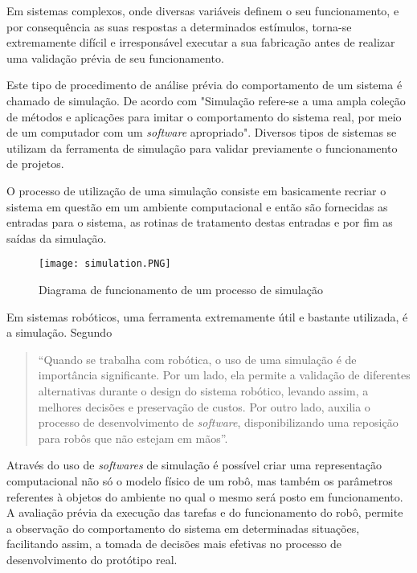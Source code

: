 Em sistemas complexos, onde diversas variáveis definem o seu funcionamento, e por consequência as suas respostas a determinados estímulos, torna-se extremamente difícil e irresponsável executar a sua fabricação antes de realizar uma validação prévia de seu funcionamento.

Este tipo de procedimento de análise prévia do comportamento de um sistema é chamado de simulação. De acordo com \cite{definicao_de_simulacao} "Simulação refere-se a uma ampla coleção de métodos e aplicações para imitar o comportamento do sistema real, por meio de um computador com um \textit{software} apropriado". Diversos tipos de sistemas se utilizam da ferramenta de simulação para validar previamente o funcionamento de projetos.

O processo de utilização de uma simulação consiste em basicamente recriar o sistema em questão em um ambiente computacional e então são fornecidas as entradas para o sistema, as rotinas de tratamento destas entradas e por fim as saídas da simulação.

\begin{figure}[h!]												
	\centering												
	\texttt{[image: simulation.PNG]}			
	\caption{Diagrama de funcionamento de um processo de simulação}		
	\label{img:simulation}	
\end{figure}


Em sistemas robóticos, uma ferramenta extremamente útil e bastante utilizada, é a simulação. Segundo \cite{artigo_sobre_simulacao} 
\begin{quote}
“Quando se trabalha com robótica, o uso de uma simulação é de importância significante. Por um lado, ela permite a validação de diferentes alternativas durante o design do sistema robótico, levando assim, a melhores decisões e preservação de custos. Por outro lado, auxilia o processo de desenvolvimento de \textit{software}, disponibilizando uma reposição para robôs que não estejam em mãos”.
\end{quote}

Através do uso de \textit{softwares} de simulação é possível criar uma representação computacional não só o modelo físico de um robô, mas também os parâmetros referentes à objetos do ambiente no qual o mesmo será posto em funcionamento. A avaliação prévia da execução das tarefas e do funcionamento do robô, permite a observação do comportamento do sistema em determinadas situações, facilitando assim, a tomada de decisões mais efetivas no processo de desenvolvimento do protótipo real. 

